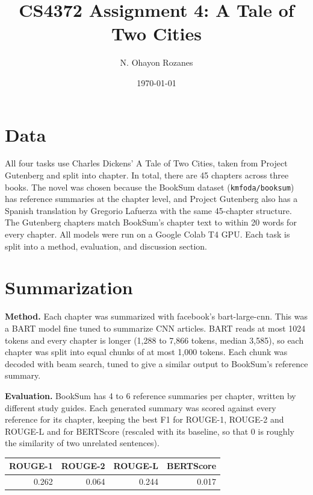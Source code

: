 \documentclass[11pt]{article}
\title{CS4372 Assignment 4: A Tale of Two Cities}
\author{N. Ohayon Rozanes}
\date{\today}
\begin{document}
\maketitle

\section*{Data}

All four tasks use Charles Dickens' A Tale of Two Cities, taken from Project
Gutenberg and split into chapter. In total, there are 45 chapters
across three books. The novel was chosen because the BookSum
dataset (\texttt{kmfoda/\allowbreak booksum}) has reference summaries
at the chapter level, and Project Gutenberg also has a Spanish translation
by Gregorio Lafuerza with the same 45-chapter structure. The
Gutenberg chapters match BookSum's chapter text to within 20 words
for every chapter. All models were run on a Google Colab T4 GPU. Each
task is split into a method, evaluation, and discussion section.

\section{Summarization}

\textbf{Method.} Each chapter was summarized with
facebook's bart-large-cnn. This was a BART model fine tuned to
summarize CNN articles. BART reads at most 1024 tokens and every
chapter is longer (1,288 to 7,866 tokens, median 3,585), so each
chapter was split into equal chunks of at most 1,000 tokens.
Each chunk was decoded with beam search, tuned to give a similar
output to BookSum's reference summary.

\textbf{Evaluation.} BookSum has 4 to 6 reference summaries per
chapter, written by different study guides. Each generated summary
was scored against every reference for its chapter, keeping the best
F1 for ROUGE-1, ROUGE-2 and ROUGE-L and for BERTScore (rescaled with
its baseline, so that 0 is roughly the similarity of two unrelated sentences).

\begin{center}
  \begin{tabular}{rrrr}
    \toprule
    ROUGE-1 & ROUGE-2 & ROUGE-L & BERTScore \\
    \midrule
    0.262 & 0.064 & 0.244 & 0.017 \\
    \bottomrule
  \end{tabular}
  \label{tab:summary-means}
\end{center}
\end{document}
